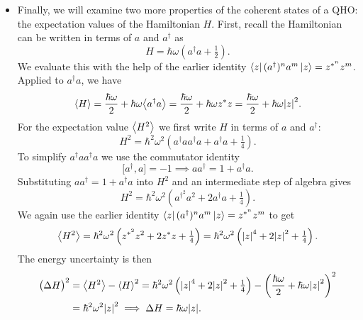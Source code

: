 \documentclass[11pt, a4paper]{article}
\newcommand{\evb}[1]{\big \langle {#1} \big \rangle}  %
\begin{document}
\begin{itemize}
	\item Finally, we will examine two more properties of the coherent states of a QHO: the expectation values of the Hamiltonian $ H $. First, recall the Hamiltonian can be written in terms of $ a $ and $ a^{\dagger} $ as
	\begin{equation*}
		H = \hbar \omega\left(a^{\dagger}a + \tfrac{1}{2}\right).
	\end{equation*}
	We evaluate this with the help of the earlier identity $ 		\bra{z}(a^{\dagger})^{n}a^{m}\ket{z} = z^{*^{n}}z^{m} $. Applied to $ a^{\dagger}a $, we have
	\begin{equation*}
		\ev{H} = \frac{\hbar \omega}{2} + \hbar \omega \evb{a^{\dagger}a} = \frac{\hbar \omega}{2} + \hbar \omega z^{*}z = \frac{\hbar \omega}{2} + \hbar \omega \abs{z}^{2}.
	\end{equation*}
	For the expectation value $ \ev{H^{2}} $ we first write $ H $ in terms of $ a  $ and $ a^{\dagger} $: 
	\begin{equation*}
		H^{2} = \hbar^{2} \omega^{2}\left(a^{\dagger}aa^{\dagger}a + a^{\dagger}a + \tfrac{1}{4}\right).
	\end{equation*}
	To simplify $ a^{\dagger}aa^{\dagger}a $ we use the commutator identity
	\begin{equation*}
		\big[a^{\dagger}, a\big] = -1 \implies aa^{\dagger} = 1 + a^{\dagger}a.
	\end{equation*}
	Substituting $ aa^{\dagger} = 1 + a^{\dagger}a $  into $ H^{2} $ and an intermediate step of algebra gives
	\begin{equation*}
		H^{2} = \hbar^{2} \omega^{2}\left(a^{\dagger^{2}}a^{2} + 2a^{\dagger}a + \tfrac{1}{4}\right).
	\end{equation*}
	We again use the earlier identity $ 		\bra{z}(a^{\dagger})^{n}a^{m}\ket{z} = z^{*^{n}}z^{m} $ to get
	\begin{equation*}
		\ev{H^{2}} = \hbar^{2} \omega^{2} \left(z^{*^{2}}z^{2} + 2z^{*}z + \tfrac{1}{4}\right) = \hbar^{2} \omega^{2} \left(\abs{z}^{4} + 2\abs{z}^{2} + \tfrac{1}{4}\right).
	\end{equation*}
    The energy uncertainty is then
	\begin{align*}
		\big(\Delta H\big)^{2} &= \ev{H^{2}} - \ev{H}^{2} = \hbar^{2} \omega^{2} \left(\abs{z}^{4} + 2\abs{z}^{2} + \tfrac{1}{4}\right) - \left(\frac{\hbar \omega}{2} + \hbar \omega \abs{z}^{2}\right)^{2}\\
		&= \hbar^{2}\omega^{2}\abs{z}^{2} \implies \Delta H = \hbar \omega \abs{z}.
	\end{align*}
	

\end{itemize}
\end{document}
